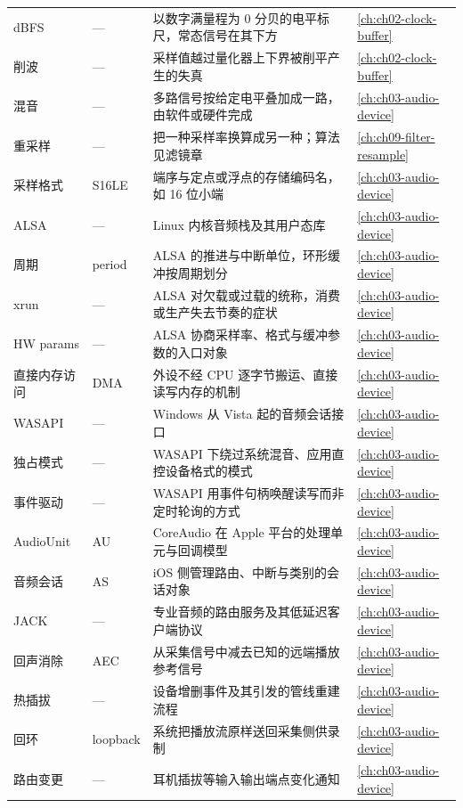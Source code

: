 \documentclass[12pt,a4paper,fontset=fandol]{ctexbook}
\begin{document}
\begin{longtable}{>{\raggedright\arraybackslash}p{} >{\raggedright\arraybackslash}p{} >{\raggedright\arraybackslash}p{} >{\raggedright\arraybackslash}p{}}
dBFS & — & 以数字满量程为 0 分贝的电平标尺，常态信号在其下方 & \ref{ch:ch02-clock-buffer} \\
削波 & — & 采样值越过量化器上下界被削平产生的失真 & \ref{ch:ch02-clock-buffer} \\
混音 & — & 多路信号按给定电平叠加成一路，由软件或硬件完成 & \ref{ch:ch03-audio-device} \\
重采样 & — & 把一种采样率换算成另一种；算法见滤镜章 & \ref{ch:ch09-filter-resample} \\
采样格式 & S16LE & 端序与定点或浮点的存储编码名，如 16 位小端 & \ref{ch:ch03-audio-device} \\
ALSA & — & Linux 内核音频栈及其用户态库 & \ref{ch:ch03-audio-device} \\
周期 & period & ALSA 的推进与中断单位，环形缓冲按周期划分 & \ref{ch:ch03-audio-device} \\
xrun & — & ALSA 对欠载或过载的统称，消费或生产失去节奏的症状 & \ref{ch:ch03-audio-device} \\
HW params & — & ALSA 协商采样率、格式与缓冲参数的入口对象 & \ref{ch:ch03-audio-device} \\
直接内存访问 & DMA & 外设不经 CPU 逐字节搬运、直接读写内存的机制 & \ref{ch:ch03-audio-device} \\
WASAPI & — & Windows 从 Vista 起的音频会话接口 & \ref{ch:ch03-audio-device} \\
独占模式 & — & WASAPI 下绕过系统混音、应用直控设备格式的模式 & \ref{ch:ch03-audio-device} \\
事件驱动 & — & WASAPI 用事件句柄唤醒读写而非定时轮询的方式 & \ref{ch:ch03-audio-device} \\
AudioUnit & AU & CoreAudio 在 Apple 平台的处理单元与回调模型 & \ref{ch:ch03-audio-device} \\
音频会话 & AS & iOS 侧管理路由、中断与类别的会话对象 & \ref{ch:ch03-audio-device} \\
JACK & — & 专业音频的路由服务及其低延迟客户端协议 & \ref{ch:ch03-audio-device} \\
回声消除 & AEC & 从采集信号中减去已知的远端播放参考信号 & \ref{ch:ch03-audio-device} \\
热插拔 & — & 设备增删事件及其引发的管线重建流程 & \ref{ch:ch03-audio-device} \\
回环 & loopback & 系统把播放流原样送回采集侧供录制 & \ref{ch:ch03-audio-device} \\
路由变更 & — & 耳机插拔等输入输出端点变化通知 & \ref{ch:ch03-audio-device} \\
\end{longtable}
\end{document}
